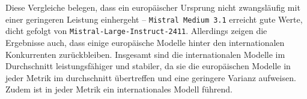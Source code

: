 Diese Vergleiche belegen, dass ein europäischer Ursprung nicht zwangsläufig mit einer geringeren Leistung einhergeht – \texttt{Mistral Medium 3.1} erreicht gute Werte, dicht gefolgt von \texttt{Mistral-Large-Instruct-2411}. Allerdings zeigen die Ergebnisse auch, dass einige europäische Modelle hinter den internationalen Konkurrenten zurückbleiben. Insgesamt sind die internationalen Modelle im Durchschnitt leistungsfähiger und stabiler, da sie die europäischen Modelle in jeder Metrik im durchschnitt übertreffen und eine geringere Varianz aufweisen. Zudem ist in jeder Metrik ein internationales Modell führend.